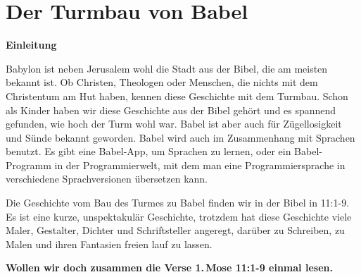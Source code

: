 \documentclass[14pt]{../../inc/mybib}
\author{Lothar Schmid}
\newenvironment{block}[1][]{%
  \vspace{1.5em}%
  \noindent\textbf{#1}\par%
  \vspace{0.0em}%
}{%
  \vspace{1em}%
}
\begin{document}
\setlength{\baselineskip}{1.5\baselineskip}

\section{Der Turmbau von Babel}
    \begin{block}[Einleitung]
    Babylon ist neben Jerusalem wohl die Stadt aus der Bibel, die am meisten bekannt ist. Ob Christen, Theologen oder Menschen, die nichts mit dem Christentum am Hut haben, kennen diese Geschichte mit dem Turmbau. Schon als Kinder haben wir diese Geschichte aus der Bibel gehört und es spannend gefunden, wie hoch der Turm wohl war. Babel ist aber auch für Zügellosigkeit und Sünde bekannt geworden. Babel wird auch im Zusammenhang mit Sprachen benutzt. Es gibt eine Babel-App, um Sprachen zu lernen, oder ein Babel-Programm in der Programmierwelt, mit dem man eine Programmiersprache in verschiedene Sprachversionen übersetzen kann.
    \end{block}
    \begin{block}
    Die Geschichte vom Bau des Turmes zu Babel finden wir in der Bibel in  {11:1-9}. Es ist eine kurze, unspektakulär Geschichte, trotzdem hat diese Geschichte viele Maler, Gestalter, Dichter und Schriftsteller angeregt, darüber zu Schreiben, zu Malen und ihren Fantasien freien lauf zu lassen. 
    \end{block}

    \textbf{Wollen wir doch zusammen die Verse 1.\,Mose 11:1-9 einmal lesen.}
    
\end{document}
